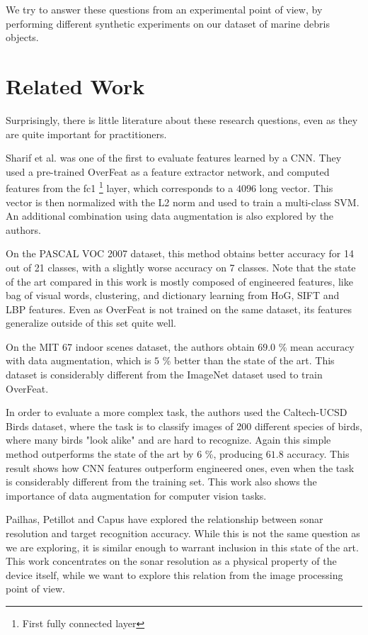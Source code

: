 We try to answer these questions from an experimental point of view, by performing different synthetic experiments on our dataset of marine debris objects.

\section{Related Work}

Surprisingly, there is little literature about these research questions, even as they are quite important for practitioners.

Sharif et al. \cite[-3em]{sharif2014cnn} was one of the first to evaluate features learned by a CNN. They used a pre-trained OverFeat \cite[1em]{sermanet2013overfeat} as a feature extractor network, and computed features from the fc1 \footnote[][1em]{First fully connected layer} layer, which corresponds to a $4096$ long vector. This vector is then normalized with the L2 norm and used to train a multi-class SVM. An additional combination using data augmentation is also explored by the authors.

On the PASCAL VOC 2007 dataset, this method obtains better accuracy for 14 out of 21 classes, with a slightly worse accuracy on 7 classes. Note that the state of the art compared in this work is mostly composed of engineered features, like bag of visual words, clustering, and dictionary learning from HoG, SIFT and LBP features. Even as OverFeat is not trained on the same dataset, its features generalize outside of this set quite well.

On the MIT 67 indoor scenes dataset, the authors obtain $69.0$ \% mean accuracy with data augmentation, which is $5$ \% better than the state of the art. This dataset is considerably different from the ImageNet dataset used to train OverFeat.

In order to evaluate a more complex task, the authors used the Caltech-UCSD Birds dataset, where the task is to classify images of 200 different species of birds, where many birds "look alike" and are hard to recognize. Again this simple method outperforms the state of the art by $6$ \%, producing $61.8$ accuracy. This result shows how CNN features outperform engineered ones, even when the task is considerably different from the training set.
This work also shows the importance of data augmentation for computer vision tasks.

Pailhas, Petillot and Capus \cite[-3em]{pailhas2010high} have explored the relationship between sonar resolution and target recognition accuracy. While this is not the same question as we are exploring, it is similar enough to warrant inclusion in this state of the art. This work concentrates on the sonar resolution as a physical property of the device itself, while we want to explore this relation from the image processing point of view.

